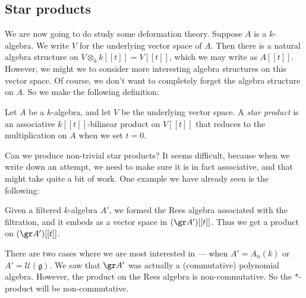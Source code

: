 \documentclass[a4paper]{article}
\begin{document}
\subsection{Star products}
We are now going to do study some deformation theory. Suppose $A$ is a $k$-algebra. We write $V$ for the underlying vector space of $A$. Then there is a natural algebra structure on $V \otimes_k k[[t]] = V[[t]]$, which we may write as $A[[t]]$. However, we might we to consider more interesting algebra structures on this vector space. Of course, we don't want to completely forget the algebra structure on $A$. So we make the following definition:

\begin{defi}
  Let $A$ be a $k$-algebra, and let $V$ be the underlying vector space. A \emph{star product} is an associative $k[[t]]$-bilinear product on $V[[t]]$ that reduces to the multiplication on $A$ when we set $t = 0$.
\end{defi}

Can we produce non-trivial star products? It seems difficult, because when we write down an attempt, we need to make sure it is in fact associative, and that might take quite a bit of work. One example we have already seen is the following:
\begin{eg} %
  Given a filtered $k$-algebra $A'$, we formed the Rees algebra associated with the filtration, and it embeds as a vector space in $(\gr A')[[t]]$. Thus we get a product on $(\gr A')[[t]]$.

  There are two cases where we are most interested in --- when $A' = A_n(k)$ or $A' = \mathcal{U}(\mathfrak{g})$. We saw that $\gr A'$ was actually a (commutative) polynomial algebra. However, the product on the Rees algebra is non-commutative. So the $*$-product will be non-commutative.
\end{eg}
\end{document}
